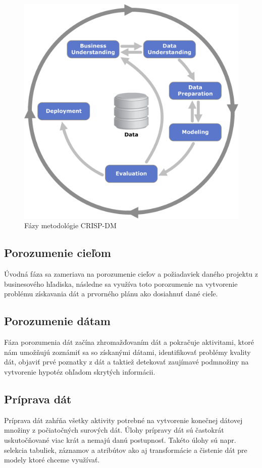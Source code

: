 \begin{figure}[H]
	\begin{center}
		\includegraphics[scale=0.6]{img/crisp-dm.png}
		\caption{Fázy metodológie CRISP-DM \cite{crisp-dm}}
		\label{img:crisp-dm}
	\end{center}
\end{figure}
\subsection{Porozumenie cieľom}
Úvodná fáza sa zameriava na porozumenie cieľov a požiadaviek daného projektu z businesového hľadiska, následne sa využíva toto porozumenie na vytvorenie problému získavania dát a prvorného plánu ako dosiahnuť dané cieľe.
\subsection{Porozumenie dátam}
Fáza porozumenia dát začína zhromažďovaním dát a pokračuje aktivitami, ktoré nám umožňujú zoznámiť sa so získanými dátami, identifikovať problémy kvality dát, objaviť prvé poznatky z dát a taktiež detekovať zaujímavé podmnožiny na vytvorenie hypotéz ohľadom skrytých informácii.
\subsection{Príprava dát}
Príprava dát zahŕňa všetky aktivity potrebné na vytvorenie konečnej dátovej množiny z počiatočných surových dát. Úlohy prípravy dát sú častokrát uskutočňované viac krát a nemajú danú postupnosť. Takéto úlohy sú napr. selekcia tabuliek, záznamov a atribútov ako aj transformácie a čistenie dát pre modely ktoré chceme využívať. 
